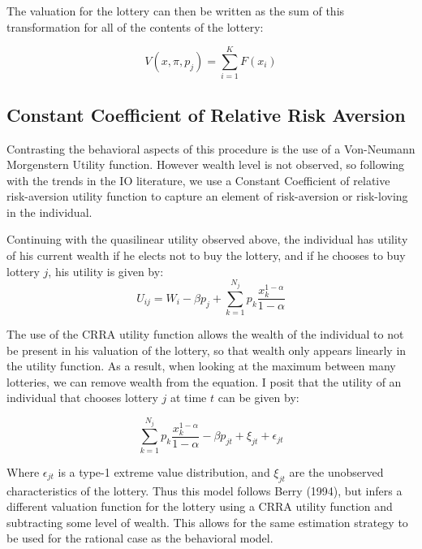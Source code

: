 \documentclass[12pt]{paper}
\begin{document}
The valuation for the lottery can then be written as the sum of this
transformation for all of the contents of the lottery:

\begin{equation*}
  V(x,\pi,p_j) = \sum_{i=1}^K F( x_i)
\end{equation*}

\subsection{Constant Coefficient of Relative Risk Aversion}

Contrasting the behavioral aspects of this procedure is the use of a
Von-Neumann Morgenstern Utility function. However wealth level is not
observed, so following with the trends in the IO literature, we use a
Constant Coefficient of relative risk-aversion utility function to
capture an element of risk-aversion or risk-loving in the
individual.

Continuing with the quasilinear utility observed above, the individual
has utility of his current wealth if he elects not to buy the lottery,
and if he chooses to buy lottery $j$, his utility is given by:
\begin{equation*}
  U_{ij} = W_i - \beta p_j + \sum_{k=1}^{N_j} p_k \frac{x_k^{1-\alpha}}{1-\alpha}
\end{equation*}

The use of the CRRA utility function allows the wealth of the
individual to not be present in his valuation of the lottery, so that
wealth only appears linearly in the utility function. As a result,
when looking at the maximum between many lotteries, we can remove
wealth from the equation. I posit that the utility of an individual
that chooses lottery $j$ at time $t$ can be given by:

\begin{equation*}
  \sum_{k=1}^{N_j} p_k \frac{x_k^{1-\alpha}}{1-\alpha} - \beta p_{jt} + \xi_{jt} + \epsilon_{jt} 
\end{equation*}

Where $\epsilon_{jt}$ is a type-1 extreme value distribution, and $\xi_{jt}$
are the unobserved characteristics of the lottery. Thus this model
follows Berry (1994), but infers a different valuation function for the
lottery using a CRRA utility function and subtracting some level of
wealth. This allows for the same estimation strategy to be used for
the rational case as the behavioral model. 
\end{document}
